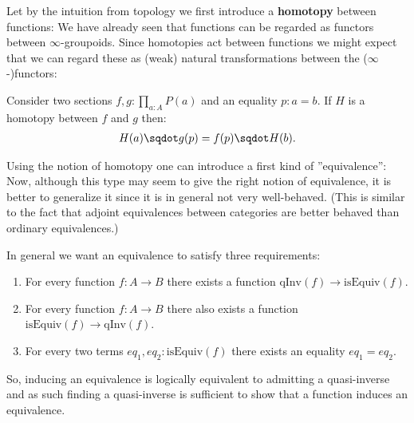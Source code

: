    Let by the intuition from topology we first introduce a \textbf{homotopy} between functions:
    We have already seen that functions can be regarded as functors between $\infty$-groupoids. Since homotopies act between functions we might expect that we can regard these as (weak) natural transformations between the ($\infty$-)functors:
    \begin{property}
        Consider two sections $f,g:\prod_{a:A}P(a)$ and an equality $p:a=b$. If $H$ is a homotopy between $f$ and $g$ then:
        \begin{gather}
            H(a)\sqdot g(p) = f(p)\sqdot H(b).
        \end{gather}
    \end{property}

    Using the notion of homotopy one can introduce a first kind of ''equivalence'':
    Now, although this type may seem to give the right notion of equivalence, it is better to generalize it since it is in general not very well-behaved. (This is similar to the fact that adjoint equivalences between categories are better behaved than ordinary equivalences.)

    In general we want an equivalence to satisfy three requirements:
    \begin{enumerate}
        \item For every function $f:A\rightarrow B$ there exists a function $\text{qInv}(f)\rightarrow\text{isEquiv}(f)$.
        \item For every function $f:A\rightarrow B$ there also exists a function $\text{isEquiv}(f)\rightarrow\text{qInv}(f)$.
        \item For every two terms $eq_1, eq_2:\text{isEquiv}(f)$ there exists an equality $eq_1=eq_2$.
    \end{enumerate}
    So, inducing an equivalence is logically equivalent to admitting a quasi-inverse and as such finding a quasi-inverse is sufficient to show that a function induces an equivalence.

